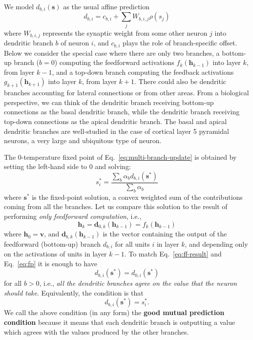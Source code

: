 \documentclass{article}
\newcommand   \vv{{\bm v}}
\newcommand   \vh{{\bm h}}
\newcommand   \vs{{\bm s}}
\newcommand   \vd{{\bm d}}
\begin{document}
We model $d_{b,i}(\vs)$ as the usual affine prediction
\begin{equation}
  \label{eq:affine-branch}
   d_{b,i} = c_{b,i} + \sum_j W_{b,i,j} \rho(s_j)
\end{equation}
where $W_{b,i,j}$ represents the synaptic weight from some other neuron $j$ into dendritic
branch $b$ of neuron $i$, and $c_{b,i}$ plays the role of branch-specific offset.
Below we consider the special case where there
are only two branches, a bottom-up branch ($b=0$) computing the feedforward activations
$f_k(\vh_{k-1})$ into layer $k$, from layer $k-1$, and a top-down branch computing the
feedback activations $g_{k+1}(\vh_{k+1})$ into layer $k$, from layer $k+1$. There
could also be dendritic branches accounting for lateral connections or from other areas.
From a biological perspective, we can think of the dendritic branch receiving bottom-up connections
as the basal dendritic branch, while the dendritic branch receiving top-down connections
as the apical dendritic branch.
The basal and apical dendritic branches are well-studied in the case of cortical layer 5
pyramidal neurons, a very large and ubiquitous type of neuron.

The 0-temperature fixed point of Eq.~\ref{eq:multi-branch-update} is obtained
by setting the left-hand side to 0 and solving:
\begin{equation}
  \label{eq:fp}
  s^*_i = \frac{\sum_b \alpha_b d_{b,i}(\vs^*)}{\sum_b \alpha_b}
\end{equation}
where $\vs^*$ is the fixed-point solution, a convex weighted sum of the contributions
coming from all the branches.
Let us compare this solution to the result of performing {\em only feedforward
  computation}, i.e.,
\begin{equation}
  \label{eq:ff-result}
  \vh_k = \vd_{0,k}(\vh_{k-1}) = f_k(\vh_{k-1})
\end{equation}
where $\vh_0=\vv$, and $\vd_{b,k}(\vh_{k-1})$ is the vector
containing the output of the feedforward (bottom-up) branch $d_{b,i}$ for all units $i$ in layer $k$,
and depending only on the activations of units in layer $k-1$.
To match Eq.~\ref{eq:ff-result} and Eq.~\ref{eq:fp} it is enough
to have
\begin{equation}
  \label{eq:ff-layerwise}
   d_{b,i}(\vs^*) = d_{0,i}(\vs^*)
\end{equation}
for all $b>0$, i.e., {\em all the dendritic branches agree on the
  value that the neuron should take}. Equivalently, the condition is that
\begin{equation}
  \label{eq:condition}
     d_{b,i}(\vs^*) = s^*_i.
\end{equation}
We call the above condition (in any form) the {\bf good mutual prediction condition}
because it means that each dendritic branch is outputting a value which agrees with
the values produced by the other branches.
\end{document}
